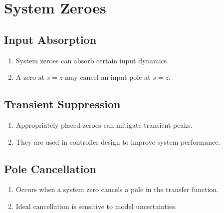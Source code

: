 \section*{System Zeroes}
\subsection*{Input Absorption}
\begin{enumerate}
    \item System zeroes can absorb certain input dynamics.
    \item A zero at \( s = z \) may cancel an input pole at \( s = z \).
\end{enumerate}

\subsection*{Transient Suppression}
\begin{enumerate}
    \item Appropriately placed zeroes can mitigate transient peaks.
    \item They are used in controller design to improve system performance.
\end{enumerate}

\subsection*{Pole Cancellation}
\begin{enumerate}
    \item Occurs when a system zero cancels a pole in the transfer function.
    \item Ideal cancellation is sensitive to model uncertainties.
\end{enumerate}